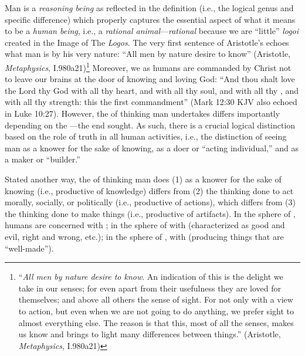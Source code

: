 Man is a \textit{reasoning being} as reflected in the definition (i.e., the logical genus and specific difference) which properly captures the essential aspect of what it means to be a \textit{human being}, i.e., a \textit{rational animal}---\textit{rational} because we are ``little'' \textit{logoi} created in the Image of The \textit{Logos}.
The very first sentence of Aristotle's  echoes what man is by his very nature: ``All men by nature desire to know'' (Aristotle, \textit{Metaphysics}, I.980a21)\footnote{``\emph{All men by nature desire to know}. An indication of this is the delight we take in our senses; for even apart from their usefulness they are loved for themselves; and above all others the sense of sight. For not only with a view to action, but even when we are not going to do anything, we prefer sight to almost everything else. The reason is that this, most of all the senses, makes us know and brings to light many differences between things.'' (Aristotle, \textit{Metaphysics}, I.980a21)} Moreover, we as humans are commanded by Christ not to leave our brains at the door of knowing and loving God: ``And thou shalt love the Lord thy God with all thy heart, and with all thy soul, and with all thy , and with all thy strength: this  the first commandment'' (Mark 12:30 KJV also echoed in Luke 10:27). However, the  of thinking man undertakes differs importantly depending on the ---the end sought. As such, there is a crucial logical distinction based on the role of truth in all human activities, i.e., the distinction of seeing man as a knower for the sake of knowing, as a doer or ``acting individual,'' and as a maker or ``builder.''

Stated another way, the  of thinking man does (1) as a knower for the sake of knowing (i.e., productive of knowledge) differs from (2) the thinking done to act morally, socially, or politically (i.e., productive of actions), which differs from (3) the thinking done to make things (i.e., productive of artifacts). In the sphere of , humans are concerned with ; in the sphere of  with  (characterized as good and evil, right and wrong, etc.); in the sphere of , with  (producing things that are ``well-made'').

